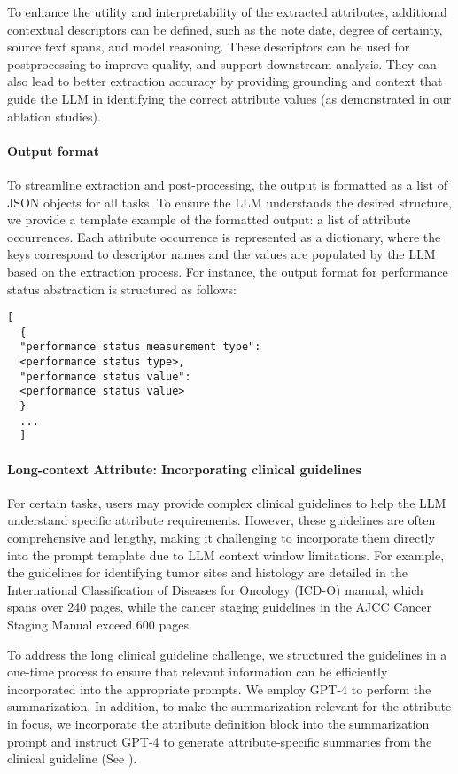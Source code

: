 To enhance the utility and interpretability of the extracted attributes, additional contextual descriptors can be defined, such as the note date, degree of certainty, source text spans, and model reasoning. 
These descriptors can be used for postprocessing to improve quality, and support downstream analysis. They can also lead to better extraction accuracy by providing grounding and context that guide the \ac{LLM} in identifying the correct attribute values (as demonstrated in our ablation studies).


\paragraph{Output format} 
To streamline extraction and post-processing, the output is formatted as a list of JSON objects for all tasks. To ensure the \ac{LLM} understands the desired structure, we provide a template example of the formatted output: a list of attribute occurrences. Each attribute occurrence is represented as a dictionary, where the keys correspond to descriptor names and the values are populated by the \ac{LLM} based on the extraction process.
For instance, the output format for performance status abstraction is structured as follows:


\begin{verbatim}
[
  {
  "performance status measurement type":
  <performance status type>,
  "performance status value":
  <performance status value>
  }
  ...
  ]
\end{verbatim}

\paragraph{Long-context Attribute: Incorporating clinical guidelines}
For certain tasks, users may provide complex clinical guidelines to help the \ac{LLM} understand specific attribute requirements. However, these guidelines are often comprehensive and lengthy, making it challenging to incorporate them directly into the prompt template due to \ac{LLM} context window limitations. For example, the guidelines for identifying tumor sites and histology are detailed in the International Classification of Diseases for Oncology (ICD-O) manual, which spans over 240 pages, while the cancer staging guidelines in the AJCC Cancer Staging Manual exceed 600 pages.

 To address the long clinical guideline challenge, we structured the guidelines in a one-time process to ensure that relevant information can be efficiently incorporated into the appropriate prompts.  We employ GPT-4 to perform the summarization. In addition, to make the summarization relevant for the attribute in focus, we incorporate the attribute definition block into the summarization prompt and instruct GPT-4 to generate attribute-specific summaries from the clinical guideline (See ).









